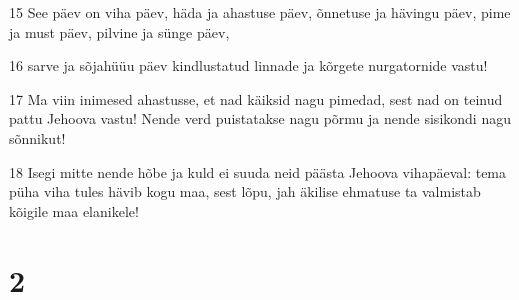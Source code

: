 \par 15 See päev on viha päev, häda ja ahastuse päev, õnnetuse ja hävingu päev, pime ja must päev, pilvine ja sünge päev,
\par 16 sarve ja sõjahüüu päev kindlustatud linnade ja kõrgete nurgatornide vastu!
\par 17 Ma viin inimesed ahastusse, et nad käiksid nagu pimedad, sest nad on teinud pattu Jehoova vastu! Nende verd puistatakse nagu põrmu ja nende sisikondi nagu sõnnikut!
\par 18 Isegi mitte nende hõbe ja kuld ei suuda neid päästa Jehoova vihapäeval: tema püha viha tules hävib kogu maa, sest lõpu, jah äkilise ehmatuse ta valmistab kõigile maa elanikele!


\chapter{2}

